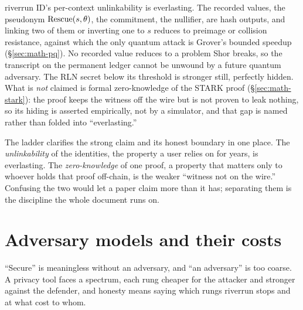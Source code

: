 \documentclass[11pt]{article}
\begin{document}
\begin{claimx}
riverrun ID's per-context unlinkability is everlasting. The recorded values, the
pseudonym $\mathrm{Rescue}(s,\theta)$, the commitment, the nullifier, are hash outputs, and
linking two of them or inverting one to $s$ reduces to preimage or collision resistance,
against which the only quantum attack is Grover's bounded speedup (\S\ref{sec:math-pq}).
No recorded value reduces to a problem Shor breaks, so the transcript on the permanent
ledger cannot be unwound by a future quantum adversary. The RLN secret below its threshold
is stronger still, perfectly hidden. What is \emph{not} claimed is formal zero-knowledge of
the STARK proof (\S\ref{sec:math-stark}): the proof keeps the witness off the wire but is
not proven to leak nothing, so its hiding is asserted empirically, not by a simulator, and
that gap is named rather than folded into ``everlasting.''
\end{claimx}

The ladder clarifies the strong claim and its honest boundary in one place. The
\emph{unlinkability} of the identities, the property a user relies on for years, is
everlasting. The \emph{zero-knowledge} of one proof, a property that matters only to
whoever holds that proof off-chain, is the weaker ``witness not on the wire.'' Confusing
the two would let a paper claim more than it has; separating them is the discipline the
whole document runs on.

\section{Adversary models and their costs}
\label{sec:adversaries}

``Secure'' is meaningless without an adversary, and ``an adversary'' is too coarse. A
privacy tool faces a spectrum, each rung cheaper for the attacker and stronger against the
defender, and honesty means saying which rungs riverrun stops and at what cost to whom.
\end{document}
